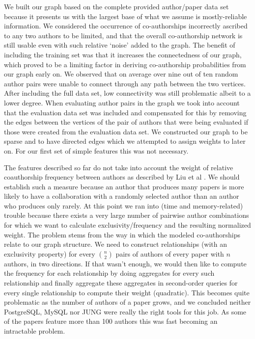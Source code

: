 We built our graph based on the complete provided author/paper data set because it presents us with the largest base of what we assume is mostly-reliable information.
We considered the occurrence of co-authorships incorrectly ascribed to any two authors to be limited, and that the overall co-authorship network is still usable even with such relative `noise' added to the graph.
The benefit of including the training set was that it increases the connectedness of our graph, which proved to be a limiting factor in deriving co-authorship probabilities from our graph early on.
We observed that on average over nine out of ten random author pairs were unable to connect through any path between the two vertices.
After including the full data set, low connectivity was still problematic albeit to a lower degree.
When evaluating author pairs in the graph we took into account that the evaluation data set was included and compensated for this by removing the edges between the vertices of the pair of authors that were being evaluated if those were created from the evaluation data set.
We constructed our graph to be sparse and to have directed edges which we attempted to assign weights to later on.
For our first set of simple features this was not necessary. 

The features described so far do not take into account the weight of relative coauthorship frequency between authors as described by Liu et al \cite{liu2005co}.
We should establish such a measure because an author that produces many papers is more likely to have a collaboration with a randomly selected author than an author who produces only rarely.
At this point we ran into (time and memory-related) trouble because there exists a very large number of pairwise author combinations for which we want to calculate exclusivity/frequency and the resulting normalized weight.
The problem stems from the way in which the modeled co-authorships relate to our graph structure.
We need to construct relationships (with an exclusivity property) for every $n \choose 2$ pairs of authors of every paper with $n$ authors, in two directions.
If that wasn't enough, we would then like to compute the frequency for each relationship by doing aggregates for every such relationship and finally aggregate these aggregates in second-order queries for every single relationship to compute their weight (quadratic).
This becomes quite problematic as the number of authors of a paper grows, and we concluded neither PostgreSQL, MySQL nor JUNG were really the right tools for this job.
As some of the papers feature more than 100 authors this was fast becoming an intractable problem.

